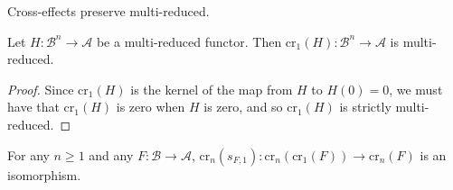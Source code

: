 Cross-effects preserve multi-reduced.

\begin{lem}[label=lem:multiRed]
    Let $H:\mathcal{B}^n\to \mathcal{A}$ be a multi-reduced functor. Then $\text{cr}_1(H):\mathcal{B}^n\to \mathcal{A}$ is multi-reduced.
\end{lem}
\begin{proof}
    Since $\text{cr}_1(H)$ is the kernel of the map from $H$ to $H(0) = 0$, we must have that $\text{cr}_1(H)$ is zero when $H$ is zero, and so $\text{cr}_1(H)$ is strictly multi-reduced.
\end{proof}


\begin{lem}[label=lem:idempotCr1]
    For any $n \geq 1$ and any $F:\mathcal{B}\rightarrow \mathcal{A}$, $\text{cr}_n(s_{F,1}):\text{cr}_n(\text{cr}_1(F))\to \text{cr}_n(F)$ is an isomorphism.
\end{lem}
